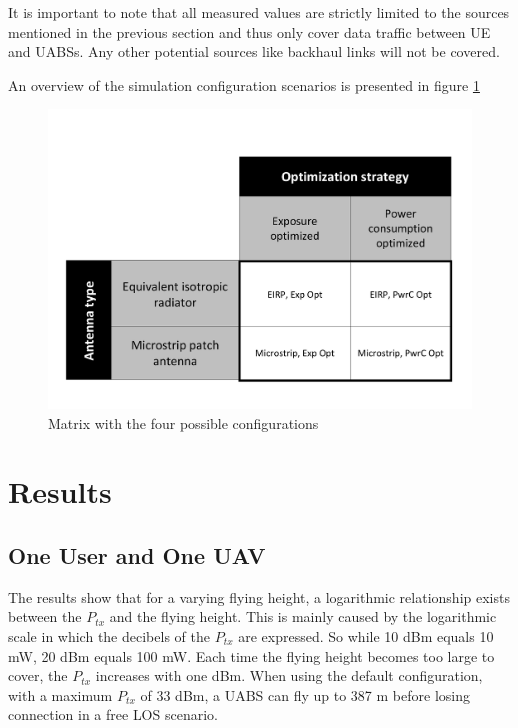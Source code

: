 \documentclass[twocolumn]{phdsymp} %
\begin{document}
It is important to note that 
all measured values are strictly limited to the sources mentioned in the previous section and thus only cover data traffic 
between \gls{UE} and \gls{UABS}s. Any other potential sources like backhaul links will not be covered.

An overview of the simulation configuration scenarios is presented in figure \ref{fig:fourCasesMatrix}

\begin{figure}[h!]
  \includegraphics[width=\linewidth]{fourCasesMatrix.pdf}
  \caption{Matrix with the four possible configurations}
  \label{fig:fourCasesMatrix}
\end{figure}

\section{Results}
\subsection{One User and One \gls{UAV}}

The  results show that for a varying flying height, a logarithmic relationship exists between the $P_{tx}$ and the flying height. 
This is mainly caused by the logarithmic 
scale in which the decibels of the $P_{tx}$ are expressed. So while 10 dBm equals 10 mW, 20 dBm equals 100 mW. 
Each time the flying height becomes too large to cover, the 
$P_{tx}$ increases with one dBm. 
When using the default configuration, with a maximum $P_{tx}$ of 33 dBm,
a \gls{UABS} can fly up to 387 m before losing connection in a free \gls{LOS} scenario.
\end{document}
